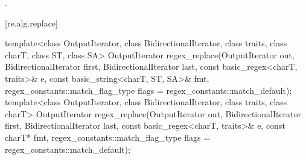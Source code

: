 \begin{itemdescr}
\pnum
\returns
{}.
\end{itemdescr}

[re.alg.replace]{}

%
\begin{itemdecl}
template<class OutputIterator, class BidirectionalIterator,
          class traits, class charT, class ST, class SA>
  OutputIterator
    regex_replace(OutputIterator out,
                  BidirectionalIterator first, BidirectionalIterator last,
                  const basic_regex<charT, traits>& e,
                  const basic_string<charT, ST, SA>& fmt,
                  regex_constants::match_flag_type flags = regex_constants::match_default);
template<class OutputIterator, class BidirectionalIterator, class traits, class charT>
  OutputIterator
    regex_replace(OutputIterator out,
                  BidirectionalIterator first, BidirectionalIterator last,
                  const basic_regex<charT, traits>& e,
                  const charT* fmt,
                  regex_constants::match_flag_type flags = regex_constants::match_default);
\end{itemdecl}

